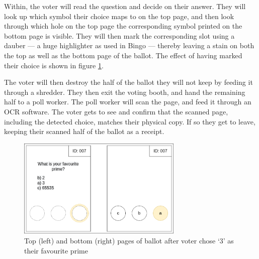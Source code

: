Within, the voter will read the question and decide on their answer. They will
look up which symbol their choice maps to on the top page, and then look
through which hole on the top page the corresponding symbol printed on the
bottom page is visible. They will then mark the corresponding slot using a
dauber --- a huge highlighter as used in Bingo --- thereby leaving a stain on
both the top as well as the bottom page of the ballot. The effect of having
marked their choice is shown in figure \ref{fig:punchscan_ballot_voted}.

The voter will then destroy the half of the ballot they will not keep by
feeding it through a shredder. They then exit the voting booth, and hand the
remaining half to a poll worker. The poll worker will scan the page, and feed
it through an OCR software. The voter gets to see and confirm that the scanned
page, including the detected choice, matches their physical copy. If so they
get to leave, keeping their scanned half of the ballot as a receipt.

\begin{figure}
\centering
\includegraphics[width=0.7\textwidth]{../resources/high_level_ballot_voted_split.drawio}
\caption{Top (left) and bottom (right) pages of ballot after voter chose `3' as their favourite prime}
\label{fig:punchscan_ballot_voted}
\end{figure}
